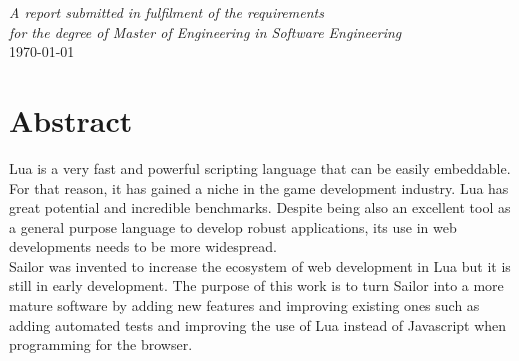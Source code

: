 \documentclass{article}
\begin{document}
\begin{titlepage}
 \textit{A report submitted in fulfilment of the requirements\\ for the degree of Master of Engineering in Software Engineering}\\[1.1cm]



{\large \today}\\[1cm] %





 

\vfill %

\end{titlepage}

\null\newpage

	\section*{Abstract}

Lua is a very fast and powerful scripting language that can be easily embeddable. For that reason, it has gained a niche in the game development industry. Lua has great potential and incredible benchmarks. Despite being also an excellent tool as a general purpose language to develop robust applications, its use in web developments needs to be more widespread. \\

Sailor was invented to increase the ecosystem of web development in Lua but it is still in early development. The purpose of this work is to turn Sailor into a more mature software by adding new features and improving existing ones such as adding automated tests and improving the use of Lua instead of Javascript when programming for the browser. 
\end{document}
